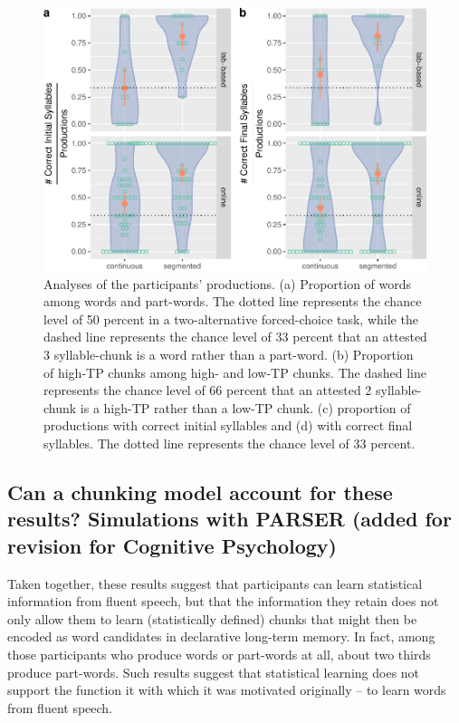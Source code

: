 \documentclass[
]{article}
\begin{document}
\begin{figure}

{\centering \includegraphics[width=0.8\linewidth]{segmentation_recall_combined_for_revision4_files/figure-latex/recall-w-pw-chunks-positions-plot-positions-1} 

}

\caption{Analyses of the participants' productions. (a) Proportion of words among words and part-words. The dotted line represents the chance level of 50 percent in a two-alternative forced-choice task, while the dashed line represents the chance level of 33 percent that an attested 3 syllable-chunk is a word rather than a part-word. (b) Proportion of high-TP chunks among high- and low-TP chunks. The dashed line represents the chance level of 66 percent that an attested 2 syllable-chunk is a high-TP rather than a low-TP chunk. (c) proportion of productions with correct initial syllables and (d) with correct final syllables. The dotted line represents the chance level of 33 percent.}\label{fig:recall-w-pw-chunks-positions-plot-positions}
\end{figure}

\clearpage

\subsection{Can a chunking model account for these results? Simulations
with PARSER (added for revision for Cognitive
Psychology)}\label{can-a-chunking-model-account-for-these-results-simulations-with-parser-added-for-revision-for-cognitive-psychology}

Taken together, these results suggest that participants can learn
statistical information from fluent speech, but that the information
they retain does not only allow them to learn (statistically defined)
chunks that might then be encoded as word candidates in declarative
long-term memory. In fact, among those participants who produce words or
part-words at all, about two thirds produce part-words. Such results
suggest that statistical learning does not support the function it with
which it was motivated originally -- to learn words from fluent speech.
\end{document}
